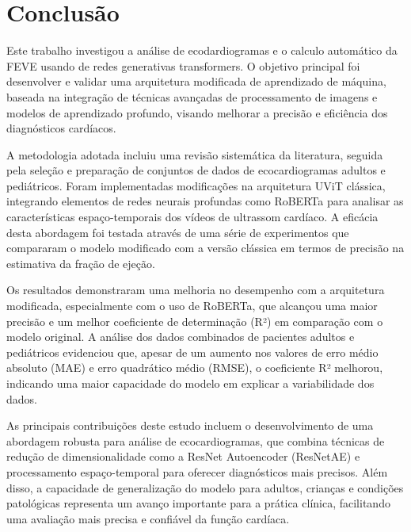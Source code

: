\chapter{Conclusão}
\label{sec:conclusão}

Este trabalho investigou a análise de ecodardiogramas e o calculo automático da FEVE usando de redes generativas transformers. O objetivo principal foi desenvolver e validar uma arquitetura modificada de aprendizado de máquina, baseada na integração de técnicas avançadas de processamento de imagens e modelos de aprendizado profundo, visando melhorar a precisão e eficiência dos diagnósticos cardíacos.

A metodologia adotada incluiu uma revisão sistemática da literatura, seguida pela seleção e preparação de conjuntos de dados de ecocardiogramas adultos e pediátricos. Foram implementadas modificações na arquitetura UViT clássica, integrando elementos de redes neurais profundas como RoBERTa para analisar as características espaço-temporais dos vídeos de ultrassom cardíaco. A eficácia desta abordagem foi testada através de uma série de experimentos que compararam o modelo modificado com a versão clássica em termos de precisão na estimativa da fração de ejeção.

Os resultados demonstraram uma melhoria no desempenho com a arquitetura modificada, especialmente com o uso de RoBERTa, que alcançou uma maior precisão e um melhor coeficiente de determinação (R²) em comparação com o modelo original. A análise dos dados combinados de pacientes adultos e pediátricos evidenciou que, apesar de um aumento nos valores de erro médio absoluto (MAE) e erro quadrático médio (RMSE), o coeficiente R² melhorou, indicando uma maior capacidade do modelo em explicar a variabilidade dos dados.

As principais contribuições deste estudo incluem o desenvolvimento de uma abordagem robusta para análise de ecocardiogramas, que combina técnicas de redução de dimensionalidade como a ResNet Autoencoder (ResNetAE) e processamento espaço-temporal para oferecer diagnósticos mais precisos. Além disso, a capacidade de generalização do modelo para adultos, crianças e condições patológicas representa um avanço importante para a prática clínica, facilitando uma avaliação mais precisa e confiável da função cardíaca.


